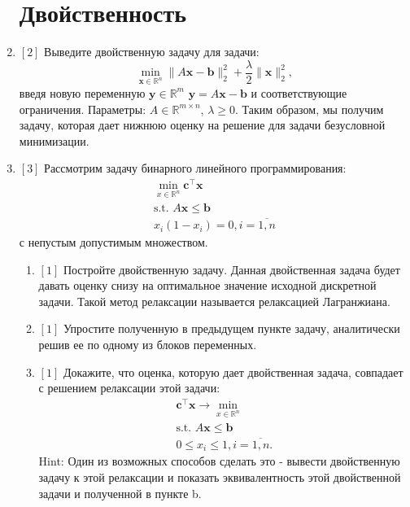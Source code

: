 \documentclass{article}
\begin{document}
\begin{enumerate}
\section{Двойственность}
    \item $[2]$  Выведите двойственную задачу для задачи:
    \begin{equation*}
        \min_{\mathbf{x}\in\mathbb{R}^n} \|A\mathbf{x}-\mathbf{b}\|_2^2+\frac{\lambda}{2}\|\mathbf{x}\|_2^2,
    \end{equation*}
    введя новую переменную $\mathbf{y}\in\mathbb{R}^m$ $\mathbf{y}=A\mathbf{x}-\mathbf{b}$ и соответствующие ограничения. Параметры: $A\in\mathbb{R}^{m\times n}$, $\lambda \geq 0$. Таким образом, мы получим задачу, которая дает нижнюю оценку на решение для задачи безусловной минимизации.
    \item $[3]$ Рассмотрим задачу бинарного линейного программирования:
    \begin{equation*}
        \begin{aligned}
      \min_{x\in\mathbb{R}^n}\textbf{c}^\top \textbf{x} \\
        \text{s.t. } A\textbf{x}\leq \textbf{b}\\
        x_i(1-x_i) = 0, i=\overline{1,n}     
        \end{aligned}
    \end{equation*}
   с непустым допустимым множеством.
    \begin{enumerate}[label=\alph*)]
        \item $[1]$ Постройте двойственную задачу. Данная двойственная задача будет давать оценку снизу на оптимальное значение исходной дискретной задачи. Такой метод релаксации называется релаксацией Лагранжиана.
        
        \item $[1]$ Упростите полученную в предыдущем пункте задачу, аналитически решив ее по одному из блоков переменных. 
        
        \item $[1]$ Докажите, что оценка, которую дает двойственная задача, совпадает с решением релаксации этой задачи:
        \begin{gather*}
            \textbf{c}^\top \textbf{x}\rightarrow \min_{x\in\mathbb{R}^n}\\
            \text{s.t. } A\textbf{x}\leq \textbf{b}\\
            0\leq x_i\leq 1, i=\overline{1,n}.
        \end{gather*}     
        Hint: Один из возможных способов сделать это - вывести двойственную задачу к этой релаксации и показать эквивалентность этой двойственной задачи и полученной в пункте b.
    \end{enumerate}
    

\end{enumerate}
\end{document}
